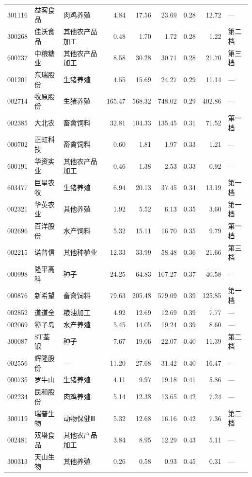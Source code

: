 \begin{longtable}{@{}llp{1.9cm}rrrrrl@{}}
301116 & 益客食品 & 肉鸡养殖 & 4.84 & 17.56 & 23.69 & 0.28 & 12.72 & --- \\
300268 & 佳沃食品 & 其他农产品加工 & 0.48 & 1.70 & 1.72 & 0.28 & 1.22 & 第二档 \\
600737 & 中粮糖业 & 其他农产品加工 & 8.58 & 30.28 & 30.71 & 0.28 & 21.70 & 第三档 \\
001201 & 东瑞股份 & 生猪养殖 & 4.55 & 15.69 & 24.27 & 0.29 & 11.14 & --- \\
002714 & 牧原股份 & 生猪养殖 & 165.47 & 568.32 & 748.02 & 0.29 & 402.86 & --- \\
002385 & 大北农 & 畜禽饲料 & 32.81 & 104.33 & 135.45 & 0.31 & 71.52 & 第一档 \\
000702 & 正虹科技 & 畜禽饲料 & 0.60 & 1.81 & 1.97 & 0.33 & 1.21 & --- \\
600191 & 华资实业 & 其他农产品加工 & 0.46 & 1.38 & 2.53 & 0.33 & 0.92 & --- \\
603477 & 巨星农牧 & 生猪养殖 & 6.94 & 20.13 & 37.45 & 0.34 & 13.19 & 第一档 \\
002321 & 华英农业 & 其他养殖 & 1.92 & 5.52 & 6.13 & 0.35 & 3.60 & 第一档 \\
002696 & 百洋股份 & 水产饲料 & 5.32 & 15.11 & 16.70 & 0.35 & 9.79 & 第一档 \\
002215 & 诺普信 & 其他种植业 & 12.33 & 33.99 & 58.48 & 0.36 & 21.66 & 第三档 \\
000998 & 隆平高科 & 种子 & 24.25 & 64.83 & 107.27 & 0.37 & 40.58 & --- \\
000876 & 新希望 & 畜禽饲料 & 79.63 & 205.48 & 579.09 & 0.39 & 125.85 & 第一档 \\
002852 & 道道全 & 粮油加工 & 4.92 & 12.69 & 12.69 & 0.39 & 7.77 & --- \\
002069 & 獐子岛 & 水产养殖 & 5.45 & 14.05 & 19.24 & 0.39 & 8.60 & --- \\
300087 & ST荃银 & 种子 & 7.67 & 19.06 & 22.07 & 0.40 & 11.39 & 第二档 \\
002556 & 辉隆股份 & --- & 11.20 & 27.68 & 31.42 & 0.40 & 16.47 & --- \\
000735 & 罗牛山 & 生猪养殖 & 4.11 & 9.97 & 19.18 & 0.41 & 5.86 & --- \\
002234 & 民和股份 & 肉鸡养殖 & 5.14 & 12.38 & 13.65 & 0.42 & 7.24 & --- \\
300119 & 瑞普生物 & 动物保健Ⅲ & 5.32 & 12.68 & 16.16 & 0.42 & 7.36 & 第二档 \\
002481 & 双塔食品 & 其他农产品加工 & 3.84 & 8.95 & 12.29 & 0.43 & 5.11 & --- \\
300313 & 天山生物 & 其他养殖 & 0.26 & 0.58 & 0.93 & 0.45 & 0.31 & --- \\

\end{longtable}
